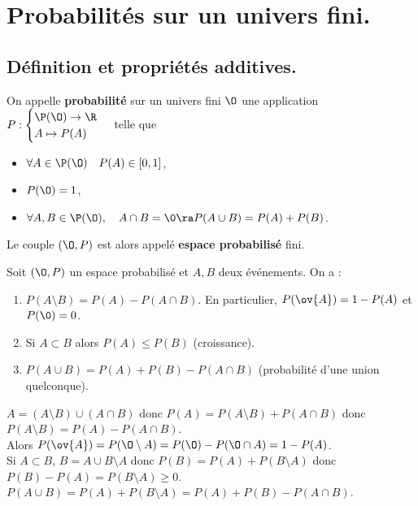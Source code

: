 \documentclass[11pt]{article}
\begin{document}
\section{Probabilités sur un univers fini.}
\subsection{Définition et propriétés additives.}

\begin{defi}{}{}
    On appelle \textbf{probabilité} sur un univers fini $\O$ une application $P:\begin{cases}\P(\O)\to\R\\A\mapsto P(A)\end{cases}$ telle que
    \begin{itemize}[topsep=0pt,itemsep=-0.9 ex]
        \item $\forall A\in\P(\O) \quad P(A)\in[0,1]$,
        \item $P(\O)=1$,
        \item $\forall A,B\in\P(\O), \quad A\cap B=\0 \ra P(A\cup B)=P(A)+P(B)$.
    \end{itemize}
    Le couple $(\O,P)$ est alors appelé \textbf{espace probabilisé} fini.
\end{defi}

\begin{prop}{}{}
    Soit $(\O,P)$ un espace probabilisé et $A,B$ deux événements. On a :
    \begin{enumerate}[topsep=0pt,itemsep=-0.9 ex]
        \item $P(A\setminus B)=P(A)-P(A\cap B)$. En particulier, $P(\ov{A})=1-P(A)$ et $P(\0)=0$.
        \item Si $A\subset B$ alors $P(A)\leq P(B)$ (croissance).
        \item $P(A\cup B)=P(A) + P(B) - P(A\cap B)$ (probabilité d'une union quelconque).
    \end{enumerate}
    \tcblower
     $A=(A\setminus B)\cup(A \cap B)$ donc $P(A)=P(A\setminus B) + P(A\cap B)$ donc $P(A\setminus B)=P(A)-P(A\cap B)$.\\
    Alors $P(\ov{A})=P(\O\setminus A)=P(\O)-P(\O\cap A)=1-P(A)$.\\
     Si $A\subset B$, $B=A\cup B\setminus A$ donc $P(B)=P(A)+P(B\setminus A)$ donc $P(B)-P(A)=P(B\setminus A)\geq0$.\\
     $P(A\cup B)=P(A)+P(B\setminus A)=P(A)+P(B)-P(A\cap B)$.
\end{prop}
\end{document}
